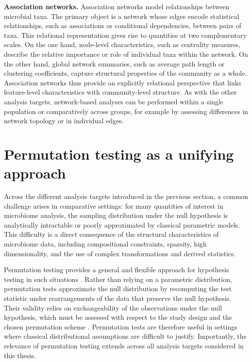 \noindent\textbf{Association networks.}
Association networks model relationships between microbial taxa. 
The primary object is a network whose edges encode statistical relationships, such as associations or conditional dependencies, between pairs of taxa. 
This relational representation gives rise to quantities at two complementary scales. 
On the one hand, node-level characteristics, such as centrality measures, describe the relative importance or role of individual taxa within the network. 
On the other hand, global network summaries, such as average path length or clustering coefficients, capture structural properties of the community as a whole. 
Association networks thus provide an explicitly relational perspective that links feature-level characteristics with community-level structure. 
As with the other analysis targets, network-based analyses can be performed within a single population or comparatively across groups, for example by assessing differences in network topology or in individual edges.


\section{Permutation testing as a unifying approach}
\label{sec:intro:permutation}

Across the different analysis targets introduced in the previous section, a common challenge arises in comparative settings: 
for many quantities of interest in microbiome analysis, the sampling distribution under the null hypothesis is analytically intractable or poorly approximated by classical parametric models. 
This difficulty is a direct consequence of the structural characteristics of microbiome data, including compositional constraints, sparsity, high dimensionality, and the use of complex transformations and derived statistics.

Permutation testing provides a general and flexible approach for hypothesis testing in such situations \citep{fisher1935design, good2005permutation}. Rather than relying on a parametric distribution, permutation tests approximate the null distribution by recomputing the test statistic under rearrangements of the data that preserve the null hypothesis. Their validity relies on exchangeability of the observations under the null hypothesis, which must be assessed with respect to the study design and the chosen permutation scheme \citep{good2005permutation}. Permutation tests are therefore useful in settings where classical distributional assumptions are difficult to justify.
Importantly, the relevance of permutation testing extends across all analysis targets considered in this thesis.

